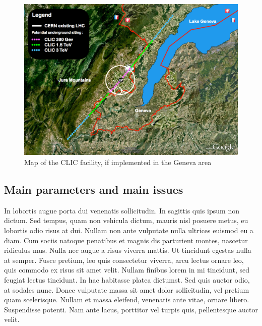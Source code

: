 \begin{figure}[h]
\centering

\includegraphics[scale=0.3]{pictures/CLIC_map}
\caption{Map of the CLIC facility, if implemented in the Geneva area}
\label{CLIC_map}

\end{figure}

 

\subsection{Main parameters and main issues}

In lobortis augue porta dui venenatis sollicitudin. In sagittis quis ipsum non dictum. Sed tempus, quam non vehicula dictum, mauris nisl posuere metus, eu lobortis odio risus at dui. Nullam non ante vulputate nulla ultrices euismod eu a diam. Cum sociis natoque penatibus et magnis dis parturient montes, nascetur ridiculus mus. Nulla nec augue a risus viverra mattis. Ut tincidunt egestas nulla at semper. Fusce pretium, leo quis consectetur viverra, arcu lectus ornare leo, quis commodo ex risus sit amet velit. Nullam finibus lorem in mi tincidunt, sed feugiat lectus tincidunt. In hac habitasse platea dictumst. Sed quis auctor odio, at sodales nunc. Donec vulputate massa sit amet dolor sollicitudin, vel pretium quam scelerisque. Nullam et massa eleifend, venenatis ante vitae, ornare libero. Suspendisse potenti. Nam ante lacus, porttitor vel turpis quis, pellentesque auctor velit.

